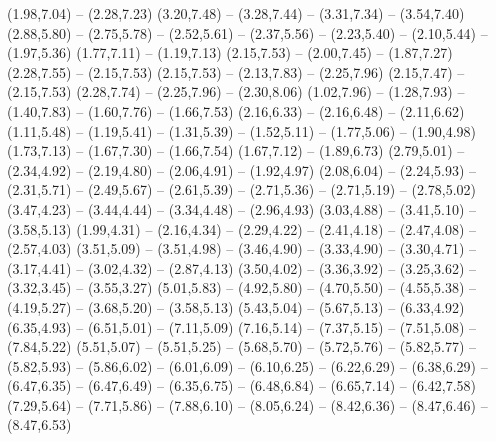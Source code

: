 \expandafter\def\csname geo:Autobahn:A46\endcsname{
  (1.98,7.04) -- (2.28,7.23)
  (3.20,7.48) -- (3.28,7.44) -- (3.31,7.34) -- (3.54,7.40)}
\expandafter\def\csname geo:Autobahn:A48\endcsname{
  (2.88,5.80) -- (2.75,5.78) -- (2.52,5.61) -- (2.37,5.56) -- (2.23,5.40) -- (2.10,5.44) -- (1.97,5.36)}
\expandafter\def\csname geo:Autobahn:A52\endcsname{
  (1.77,7.11) -- (1.19,7.13)
  (2.15,7.53) -- (2.00,7.45) -- (1.87,7.27)
  (2.28,7.55) -- (2.15,7.53)
  (2.15,7.53) -- (2.13,7.83) -- (2.25,7.96)
  (2.15,7.47) -- (2.15,7.53)
  (2.28,7.74) -- (2.25,7.96) -- (2.30,8.06)}
\expandafter\def\csname geo:Autobahn:A57\endcsname{
  (1.02,7.96) -- (1.28,7.93) -- (1.40,7.83) -- (1.60,7.76) -- (1.66,7.53)}
\expandafter\def\csname geo:Autobahn:A59\endcsname{
  (2.16,6.33) -- (2.16,6.48) -- (2.11,6.62)}
\expandafter\def\csname geo:Autobahn:A60\endcsname{
  (1.11,5.48) -- (1.19,5.41) -- (1.31,5.39) -- (1.52,5.11) -- (1.77,5.06) -- (1.90,4.98)}
\expandafter\def\csname geo:Autobahn:A61\endcsname{
  (1.73,7.13) -- (1.67,7.30) -- (1.66,7.54)
  (1.67,7.12) -- (1.89,6.73)
  (2.79,5.01) -- (2.34,4.92) -- (2.19,4.80) -- (2.06,4.91) -- (1.92,4.97)
  (2.08,6.04) -- (2.24,5.93) -- (2.31,5.71) -- (2.49,5.67) -- (2.61,5.39) -- (2.71,5.36) -- (2.71,5.19) -- (2.78,5.02)
  (3.47,4.23) -- (3.44,4.44) -- (3.34,4.48) -- (2.96,4.93)
  (3.03,4.88) -- (3.41,5.10) -- (3.58,5.13)}
\expandafter\def\csname geo:Autobahn:A62\endcsname{
  (1.99,4.31) -- (2.16,4.34) -- (2.29,4.22) -- (2.41,4.18) -- (2.47,4.08) -- (2.57,4.03)}
\expandafter\def\csname geo:Autobahn:A63\endcsname{
  (3.51,5.09) -- (3.51,4.98) -- (3.46,4.90) -- (3.33,4.90) -- (3.30,4.71) -- (3.17,4.41) -- (3.02,4.32) -- (2.87,4.13)}
\expandafter\def\csname geo:Autobahn:A65\endcsname{
  (3.50,4.02) -- (3.36,3.92) -- (3.25,3.62) -- (3.32,3.45) -- (3.55,3.27)}
\expandafter\def\csname geo:Autobahn:A66\endcsname{
  (5.01,5.83) -- (4.92,5.80) -- (4.70,5.50) -- (4.55,5.38) -- (4.19,5.27) -- (3.68,5.20) -- (3.58,5.13)}
\expandafter\def\csname geo:Autobahn:A70\endcsname{
  (5.43,5.04) -- (5.67,5.13) -- (6.33,4.92)
  (6.35,4.93) -- (6.51,5.01) -- (7.11,5.09)
  (7.16,5.14) -- (7.37,5.15) -- (7.51,5.08) -- (7.84,5.22)}
\expandafter\def\csname geo:Autobahn:A71\endcsname{
  (5.51,5.07) -- (5.51,5.25) -- (5.68,5.70) -- (5.72,5.76) -- (5.82,5.77) -- (5.82,5.93) -- (5.86,6.02) -- (6.01,6.09) -- (6.10,6.25) -- (6.22,6.29) -- (6.38,6.29) -- (6.47,6.35) -- (6.47,6.49) -- (6.35,6.75) -- (6.48,6.84) -- (6.65,7.14) -- (6.42,7.58)}
\expandafter\def\csname geo:Autobahn:A72\endcsname{
  (7.29,5.64) -- (7.71,5.86) -- (7.88,6.10) -- (8.05,6.24) -- (8.42,6.36) -- (8.47,6.46) -- (8.47,6.53)}
